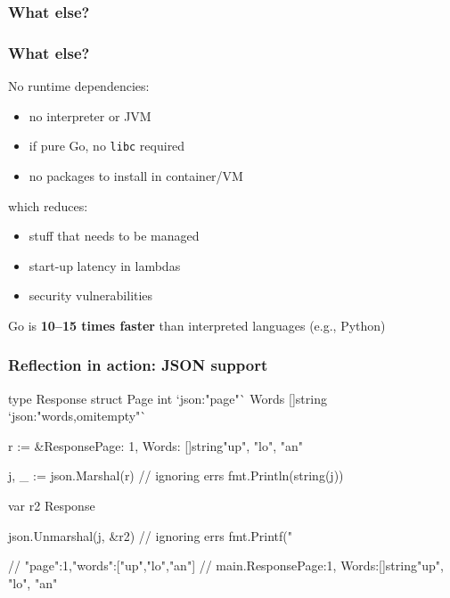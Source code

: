 \documentclass[handout,compress,t,11pt]{beamer}
\begin{document}
\begin{frame}[fragile]
    \frametitle{What else?}
    \vspace{\baselineskip}
    \vspace{\baselineskip}
    \vspace{\baselineskip}
    \vspace{\baselineskip}
    \vspace{1.6\baselineskip}
\end{frame}

\begin{frame}[fragile]
    \frametitle{What else?}
    No runtime dependencies:
    \begin{itemize}
        \item no interpreter or JVM
        \item if pure Go, no \verb|libc| required
        \item no packages to install in container/VM
    \end{itemize}
    \vspace{\baselineskip}
    which reduces:
    \begin{itemize}
        \item stuff that needs to be managed
        \item start-up latency in lambdas
        \item security vulnerabilities
    \end{itemize}
    \vspace{1.5\baselineskip}
    Go is {\bf 10--15 times faster} than interpreted languages (e.g., Python)
\end{frame}

\begin{frame}[fragile]
    \frametitle{Reflection in action: JSON support}
\begin{golang}
type Response struct {
    Page  int      `json:"page"`
    Words []string `json:"words,omitempty"`
}

r := &Response{Page: 1, Words: []string{"up", "lo", "an"}}

j, _ := json.Marshal(r)              // ignoring errs
fmt.Println(string(j))

var r2 Response

json.Unmarshal(j, &r2)               // ignoring errs
fmt.Printf("%

// {"page":1,"words":["up","lo","an"]}
// main.Response{Page:1, Words:[]string{"up", "lo", "an"}}
\end{golang}
\end{frame}
\end{document}
